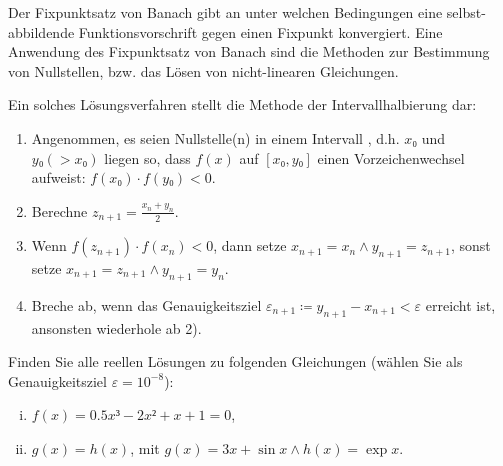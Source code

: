 
\NewDocumentCommand{}
\date{Ausgabe: Fr, 03.05.2019, Besprechung: Fr, 10.05.2019}
\setcounter{question}{6}


\maketitle

\begin{question}[subtitle=Fixpunktsatz von Banach]
  Der Fixpunktsatz von Banach gibt an unter welchen Bedingungen eine selbst-abbildende Funktionsvorschrift gegen einen Fixpunkt konvergiert.
  Eine Anwendung des Fixpunktsatz von Banach sind die Methoden zur Bestimmung von Nullstellen, bzw. das Lösen von nicht-linearen Gleichungen.

  Ein solches Lösungsverfahren stellt die Methode der Intervallhalbierung dar:
  \begin{enumerate}[1)]
  \item Angenommen, es seien Nullstelle(n) in einem Intervall , d.h. $x₀$ und $y₀ (> x₀)$ liegen so, dass $f(x)$ auf $[x₀, y₀]$ einen Vorzeichenwechsel aufweist: $f(x₀) · f(y₀) < 0$.
  \item Berechne $z_{n + 1} = \frac{x_n + y_n}{2}$.
  \item Wenn $f(z_{n + 1}) · f(x_n) < 0$, dann setze $x_{n + 1} = x_n ∧ y_{n + 1} = z_{n + 1}$, sonst setze $x_{n + 1} = z_{n + 1} ∧ y_{n + 1} = y_n$.
  \item Breche ab, wenn das Genauigkeitsziel $ε_{n + 1} ≔ y_{n + 1} - x_{n + 1} < ε$ erreicht ist, ansonsten wiederhole ab 2).
  \end{enumerate}

  Finden Sie alle reellen Lösungen zu folgenden Gleichungen (wählen Sie als Genauigkeitsziel $ε = 10^{-8}$):
  \begin{enumerate}[(i)]
  \item $f(x) = 0.5 x³ - 2 x² + x + 1 = 0$,
  \item $g(x) = h(x)$, mit $g(x) = 3x + \sin x ∧ h(x) = \exp x$.
  \end{enumerate}
\end{question}

